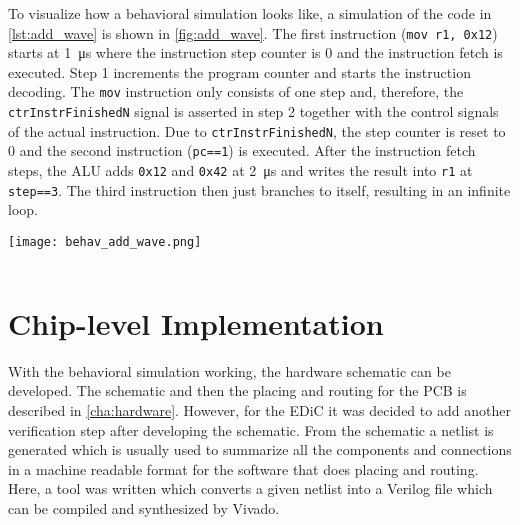 To visualize how a behavioral simulation looks like, a simulation of the code in \cref{lst:add_wave} is shown in \cref{fig:add_wave}.
The first instruction (\texttt{mov r1, 0x12}) starts at \qty{1}{\micro\second} where the instruction step counter is 0 and the instruction fetch is executed.
Step 1 increments the program counter and starts the instruction decoding.
The \texttt{mov} instruction only consists of one step and, therefore, the \texttt{ctrInstrFinishedN} signal is asserted in step 2 together with the control signals of the actual instruction.
Due to \texttt{ctrInstrFinishedN}, the step counter is reset to 0 and the second instruction (\texttt{pc==1}) is executed.
After the instruction fetch steps, the \gls{ALU} adds \texttt{0x12} and \texttt{0x42} at \qty{2}{\micro\second} and writes the result into \texttt{r1} at \texttt{step==3}.
The third instruction then just branches to itself, resulting in an infinite loop.
\begin{sidewaysfigure}[p]
  \centering
  \texttt{[image: behav\_add\_wave.png]}
  \caption{Waveform of the relevant signals for setting a register to \texttt{0x12} and adding \texttt{0x2f} to it (Assembler code is shown in \cref{lst:add_wave}).}
  \label{fig:add_wave}
\end{sidewaysfigure}
\begin{listing}
  \inputminted[linenos,
    breaklines,
    frame=leftline,
    xleftmargin=20pt,
  ]{ARM}{src/sim_test.s}
  \caption{The code for the waveform example of \cref{fig:add_wave}.}
  \label{lst:add_wave}
\end{listing}

\section{Chip-level Implementation}
With the behavioral simulation working, the hardware schematic can be developed.
The schematic and then the placing and routing for the \gls{PCB} is described in \cref{cha:hardware}.
However, for the \gls{EDiC} it was decided to add another verification step after developing the schematic.
From the schematic a netlist is generated which is usually used to summarize all the components and connections in a machine readable format for the software that does placing and routing.
Here, a tool was written which converts a given netlist into a Verilog file which can be compiled and synthesized by Vivado.
